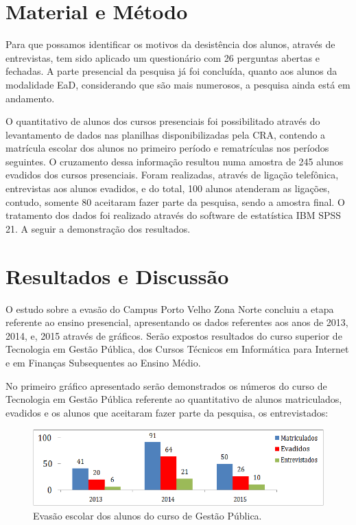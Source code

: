\documentclass[article,12pt,onesidea,4paper,english,brazil]{abntex2}
\begin{document}
	\section*{Material e Método}
	
	Para que possamos identificar os motivos da desistência dos alunos, através de entrevistas, tem sido aplicado um questionário com 26 perguntas abertas e fechadas. A parte presencial da pesquisa já foi concluída, quanto aos alunos da modalidade EaD, considerando que são mais numerosos, a pesquisa ainda está em andamento.
	
	O quantitativo de alunos dos cursos presenciais foi possibilitado através do levantamento de dados nas planilhas disponibilizadas pela CRA, contendo a matrícula escolar dos alunos no primeiro período e rematrículas nos períodos seguintes. O cruzamento dessa informação resultou numa amostra de 245 alunos evadidos dos cursos presenciais. Foram realizadas, através de ligação telefônica, entrevistas aos alunos evadidos, e do total, 100 alunos atenderam as ligações, contudo, somente 80 aceitaram fazer parte da pesquisa, sendo a amostra final. O tratamento dos dados foi realizado através do software de estatística IBM SPSS 21. A seguir a demonstração dos resultados.
	
	\section*{Resultados e Discussão}
	
O estudo sobre a evasão do Campus Porto Velho Zona Norte concluiu a etapa referente ao ensino presencial, apresentando os dados referentes aos anos de 2013, 2014, e, 2015 através de gráficos. Serão expostos resultados do curso superior de Tecnologia em Gestão Pública, dos Cursos Técnicos em Informática para Internet e em Finanças Subsequentes ao Ensino Médio.

No primeiro gráfico apresentado serão demonstrados os números do curso de Tecnologia em Gestão Pública referente ao quantitativo de alunos matriculados, evadidos e os alunos que aceitaram fazer parte da pesquisa, os entrevistados:
\begin{figure}[h]
	\centering
	\includegraphics[width=0.5\linewidth]{pip-pg78-01}
	\caption{Evasão escolar dos alunos do curso de Gestão Pública.}
	\label{fig:pip-pg78-01}
\end{figure}
\end{document}
